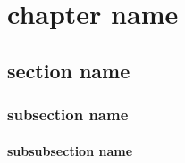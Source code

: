 \documentclass[UTF8]{ctexbook}
\begin{document}
\chapter{chapter name}
  \label{chap:chapter_name}
\newpage

\section{section name}
  \label{sec:section_name}
  \subsection{subsection name}
    \label{subsec:subsection_name}
    \subsubsection{subsubsection name}
      \label{subsubsec:subsubsection_name}
\end{document}
